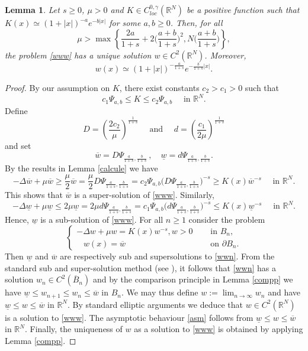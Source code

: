\documentclass[leqno,12pt]{article}
\newcommand{\R}{\mathbb R}
\newtheorem{lemma}[theorem]{Lemma}
\numberwithin{equation}{section}
\begin{document}
\begin{lemma}\label{exi}
Let $s\geq 0$, $\mu>0$ and $K\in C^{0, \gamma}_{loc}(\R^N)$ be a positive function such that $K(x)\simeq (1+|x|)^{-a}e^{-b|x|}$ for some $a,b\geq 0$. 
Then, for all
\begin{equation}\label{mmu}
\mu>\max\left\{\frac{2a}{1+s}+2\Big(\frac{a+b}{1+s}\Big)^2, N \Big(\frac{a+b}{1+s}\Big) \right\},
\end{equation}
the problem \eqref{www}
has a unique solution $w\in C^2(\R^N)$. Moreover, 
\begin{equation}\label{asm}
w(x)\simeq (1+|x|)^{-\frac{a}{1+s}} e^{-\frac{b}{1+s}|x|}.
\end{equation} 
\end{lemma}
\begin{proof}
By our assumption on $K$, there exist constants $c_2>c_1>0$ such that
$$
c_1\Psi_{a,b}\leq K\leq c_2 \Psi_{a,b}\quad\mbox{ in }\R^N.
$$
Define
$$
D=\left( \frac{2c_2}{\mu} \right)^{\frac{1}{1+s}}\quad\mbox{ and }\quad 
d=\left( \frac{c_1}{2\mu} \right)^{\frac{1}{1+s}}
$$
and set 
$$
\overline w=D\Psi_{\frac{a}{1+s},\frac{b}{1+s}}\, , \quad \underline w=d\Psi_{\frac{a}{1+s},\frac{b}{1+s}}.
$$
By the results in Lemma \ref{calcule} we have
$$
-\Delta \overline w+\mu \overline w\geq \frac{\mu}{2} \overline w= \frac{\mu}{2} D \Psi_{\frac{a}{1+s},\frac{b}{1+s}}=c_2 \Psi_{a,b} \Big( D \Psi_{\frac{a}{1+s},\frac{b}{1+s}}\Big)^{-s}\geq K(x) \overline w^{-s}\quad\mbox{ in }\R^N.
$$
This shows that $\overline w$ is a super-solution of \eqref{www}. Similarly, 
$$
-\Delta \underline w+\mu \underline w\leq 2\mu \underline w=2\mu d \Psi_{\frac{a}{1+s},\frac{b}{1+s}}=c_1 \Psi_{a,b} \Big( d \Psi_{\frac{a}{1+s},\frac{b}{1+s}}\Big)^{-s}\leq K(x) \underline w^{-s}\quad\mbox{ in }\R^N.
$$
Hence, $\underline w$ is a sub-solution of \eqref{www}.
For all $n\geq 1$ consider the problem
\begin{equation}\label{wwn}
\begin{cases}
-\Delta w+\mu w=K(x) w^{-s}, w>0 &\quad\mbox{ in }B_n,\\
\;\;\; w(x)=\overline w& \quad\mbox{ on }\partial B_n.
\end{cases}
\end{equation}
Then $\underline w$ and $\overline w$ are respectively sub and supersolutions to \eqref{wwn}. From the standard sub and super-solution method (see \cite[Section 3]{Pao92}), it follows that  \eqref{wwn} has a solution $w_n\in C^2(\overline B_n)$ and by the comparison principle in Lemma \ref{compp} we have $\underline w\leq w_{n+1}\leq w_n\leq \overline w$ in $B_n$. We may thus define $w:=\lim_{n\to \infty} w_n$ and have $\underline w\leq w \leq \overline w$ in $\R^N$. By standard elliptic arguments we deduce that $w\in C^2(\R^N)$ is a solution to \eqref{www}. The asymptotic behaviour \eqref{asm} follows from $\underline w\leq w \leq \overline w$ in $\R^N$. Finally, the uniqueness of $w$ as a solution to \eqref{www} is obtained by applying Lemma \ref{compp}. 
\end{proof}
\end{document}
